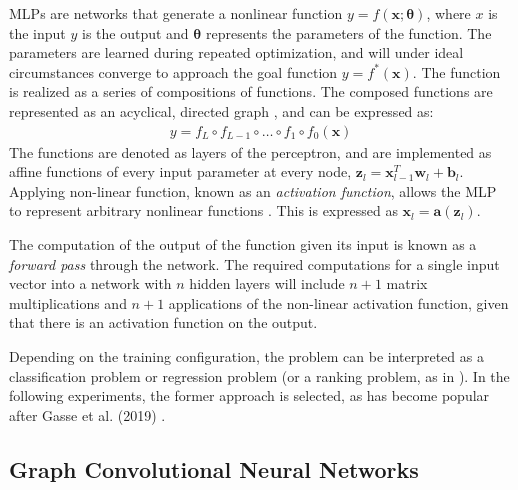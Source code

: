 \gls{MLP}s are networks that generate a nonlinear function $y = f(\mathbf{x}; \bm{\theta})$, where $x$ is the input $y$ is the output and $\bm{\theta}$ represents the parameters of the function. The parameters are learned during repeated optimization, and will under ideal circumstances converge to approach the goal function $y = f^*(\mathbf{x})$. The function is realized as a series of compositions of functions. The composed functions are represented as an acyclical, directed graph \cite{nielsen2018neural}, and can be expressed as:
\begin{align}
    y = f_L \circ f_{L-1} \circ \ldots \circ f_{1} \circ f_{0} (\mathbf{x})  
\end{align}
The functions are denoted as layers of the perceptron, and are implemented as affine functions of every input parameter at every node, $\mathbf{z}_l = \mathbf{x}_{l-1}^T \mathbf{w}_l + \mathbf{b}_l$. Applying non-linear function, known as an \textit{activation function}, allows the \gls{MLP} to represent arbitrary nonlinear functions \cite{goodfellow2016deep}. This is expressed as $\mathbf{x}_l = \mathbf{a}(\mathbf{z}_l)$.

The computation of the output of the function given its input is known as a \textit{forward pass} through the network. The required computations for a single input vector into a network with $ n $ hidden layers will include $ n + 1 $ matrix multiplications and $ n + 1 $ applications of the non-linear activation function, given that there is an activation function on the output. 

Depending on the training configuration, the problem can be interpreted as a classification problem or regression problem (or a ranking problem, as in \cite{khalil2016learning}). In the following experiments, the former approach is selected, as has become popular after Gasse et al. (2019) \cite{gasse2019exact}. 










\subsection{Graph Convolutional Neural Networks }


